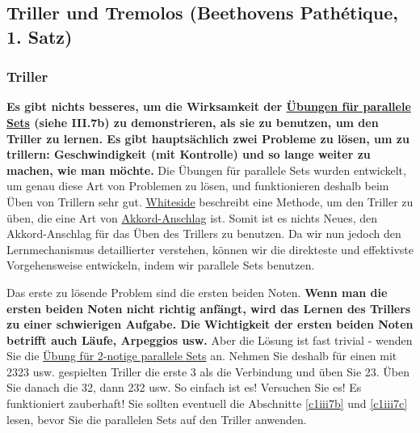 
\subsection{Triller und Tremolos (Beethovens Pathétique, 1. Satz)}
\label{c1iii3}

\subsubsection{Triller}

\textbf{Es gibt nichts besseres, um die Wirksamkeit der \hyperref[c1iii7b]{Übungen für parallele Sets} (siehe III.7b) zu demonstrieren, als sie zu benutzen, um den Triller zu lernen.
Es gibt hauptsächlich zwei Probleme zu lösen, um zu trillern: Geschwindigkeit (mit Kontrolle) und so lange weiter zu machen, wie man möchte.}
Die Übungen für parallele Sets wurden entwickelt, um genau diese Art von Problemen zu lösen, und funktionieren deshalb beim Üben von Trillern sehr gut.
\hyperref[Whiteside]{Whiteside} beschreibt eine Methode, um den Triller zu üben, die eine Art von \hyperref[c1ii9]{Akkord-Anschlag} ist.
Somit ist es nichts Neues, den Akkord-Anschlag für das Üben des Trillers zu benutzen.
Da wir nun jedoch den Lernmechanismus detaillierter verstehen, können wir die direkteste und effektivste Vorgehensweise entwickeln, indem wir parallele Sets benutzen.

Das erste zu lösende Problem sind die ersten beiden Noten.
\textbf{Wenn man die ersten beiden Noten nicht richtig anfängt, wird das Lernen des Trillers zu einer schwierigen Aufgabe.
Die Wichtigkeit der ersten beiden Noten betrifft auch Läufe, Arpeggios usw.}
Aber die Lösung ist fast trivial - wenden Sie die \hyperref[c1iii7b2]{Übung für 2-notige parallele Sets} an.
Nehmen Sie deshalb für einen mit 2323 usw. gespielten Triller die erste 3 als die Verbindung und üben Sie 23.
Üben Sie danach die 32, dann 232 usw.
So einfach ist es! Versuchen Sie es! Es funktioniert zauberhaft!
Sie sollten eventuell die Abschnitte \hyperref[c1iii7b]{\autoref{c1iii7b}} und \hyperref[c1iii7c]{\autoref{c1iii7c}} lesen, bevor Sie die parallelen Sets auf den Triller anwenden.

